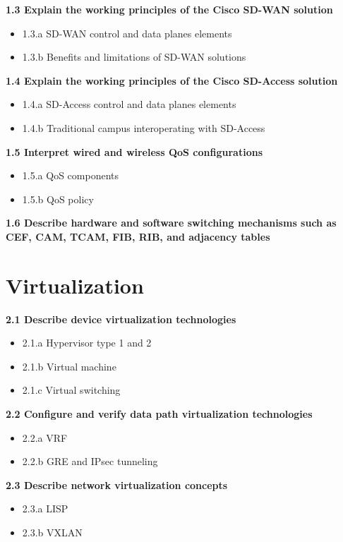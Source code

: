 \documentclass{article}
\begin{document}
\noindent\textbf{1.3 Explain the working principles of the Cisco SD-WAN solution}
\begin{itemize}
\item 1.3.a SD-WAN control and data planes elements
\item 1.3.b Benefits and limitations of SD-WAN solutions
\end{itemize}

\noindent\textbf{1.4 Explain the working principles of the Cisco SD-Access solution}
\begin{itemize}
\item 1.4.a SD-Access control and data planes elements
\item 1.4.b Traditional campus interoperating with SD-Access
\end{itemize}

\noindent\textbf{1.5 Interpret wired and wireless QoS configurations}
\begin{itemize}
\item 1.5.a QoS components
\item 1.5.b QoS policy
\end{itemize}

\noindent\textbf{1.6 Describe hardware and software switching mechanisms such as CEF, CAM, TCAM, FIB, RIB, and adjacency tables}\\

\section{Virtualization}
\textbf{2.1 Describe device virtualization technologies}
\begin{itemize}
\item 2.1.a Hypervisor type 1 and 2
\item 2.1.b Virtual machine
\item 2.1.c Virtual switching
\end{itemize}

\noindent\textbf{2.2 Configure and verify data path virtualization technologies}
\begin{itemize}
\item 2.2.a VRF
\item 2.2.b GRE and IPsec tunneling
\end{itemize}

\noindent\textbf{2.3 Describe network virtualization concepts}
\begin{itemize}
\item 2.3.a LISP
\item 2.3.b VXLAN
\end{itemize}
\end{document}
